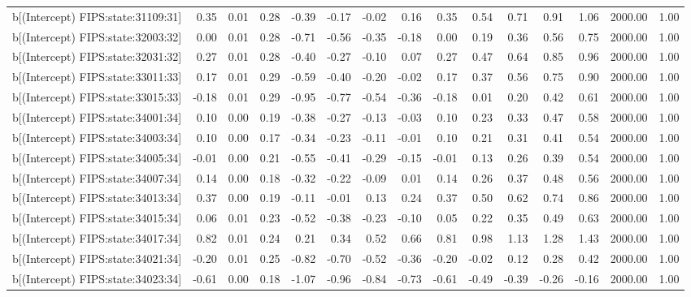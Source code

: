 \begin{table}[ht]
\begin{tabular}{rrrrrrrrrrrrrrr}
  b[(Intercept) FIPS:state:31109:31] & 0.35 & 0.01 & 0.28 & -0.39 & -0.17 & -0.02 & 0.16 & 0.35 & 0.54 & 0.71 & 0.91 & 1.06 & 2000.00 & 1.00 \\ 
  b[(Intercept) FIPS:state:32003:32] & 0.00 & 0.01 & 0.28 & -0.71 & -0.56 & -0.35 & -0.18 & 0.00 & 0.19 & 0.36 & 0.56 & 0.75 & 2000.00 & 1.00 \\ 
  b[(Intercept) FIPS:state:32031:32] & 0.27 & 0.01 & 0.28 & -0.40 & -0.27 & -0.10 & 0.07 & 0.27 & 0.47 & 0.64 & 0.85 & 0.96 & 2000.00 & 1.00 \\ 
  b[(Intercept) FIPS:state:33011:33] & 0.17 & 0.01 & 0.29 & -0.59 & -0.40 & -0.20 & -0.02 & 0.17 & 0.37 & 0.56 & 0.75 & 0.90 & 2000.00 & 1.00 \\ 
  b[(Intercept) FIPS:state:33015:33] & -0.18 & 0.01 & 0.29 & -0.95 & -0.77 & -0.54 & -0.36 & -0.18 & 0.01 & 0.20 & 0.42 & 0.61 & 2000.00 & 1.00 \\ 
  b[(Intercept) FIPS:state:34001:34] & 0.10 & 0.00 & 0.19 & -0.38 & -0.27 & -0.13 & -0.03 & 0.10 & 0.23 & 0.33 & 0.47 & 0.58 & 2000.00 & 1.00 \\ 
  b[(Intercept) FIPS:state:34003:34] & 0.10 & 0.00 & 0.17 & -0.34 & -0.23 & -0.11 & -0.01 & 0.10 & 0.21 & 0.31 & 0.41 & 0.54 & 2000.00 & 1.00 \\ 
  b[(Intercept) FIPS:state:34005:34] & -0.01 & 0.00 & 0.21 & -0.55 & -0.41 & -0.29 & -0.15 & -0.01 & 0.13 & 0.26 & 0.39 & 0.54 & 2000.00 & 1.00 \\ 
  b[(Intercept) FIPS:state:34007:34] & 0.14 & 0.00 & 0.18 & -0.32 & -0.22 & -0.09 & 0.01 & 0.14 & 0.26 & 0.37 & 0.48 & 0.56 & 2000.00 & 1.00 \\ 
  b[(Intercept) FIPS:state:34013:34] & 0.37 & 0.00 & 0.19 & -0.11 & -0.01 & 0.13 & 0.24 & 0.37 & 0.50 & 0.62 & 0.74 & 0.86 & 2000.00 & 1.00 \\ 
  b[(Intercept) FIPS:state:34015:34] & 0.06 & 0.01 & 0.23 & -0.52 & -0.38 & -0.23 & -0.10 & 0.05 & 0.22 & 0.35 & 0.49 & 0.63 & 2000.00 & 1.00 \\ 
  b[(Intercept) FIPS:state:34017:34] & 0.82 & 0.01 & 0.24 & 0.21 & 0.34 & 0.52 & 0.66 & 0.81 & 0.98 & 1.13 & 1.28 & 1.43 & 2000.00 & 1.00 \\ 
  b[(Intercept) FIPS:state:34021:34] & -0.20 & 0.01 & 0.25 & -0.82 & -0.70 & -0.52 & -0.36 & -0.20 & -0.02 & 0.12 & 0.28 & 0.42 & 2000.00 & 1.00 \\ 
  b[(Intercept) FIPS:state:34023:34] & -0.61 & 0.00 & 0.18 & -1.07 & -0.96 & -0.84 & -0.73 & -0.61 & -0.49 & -0.39 & -0.26 & -0.16 & 2000.00 & 1.00 \\ 

\end{tabular}
\end{table}
